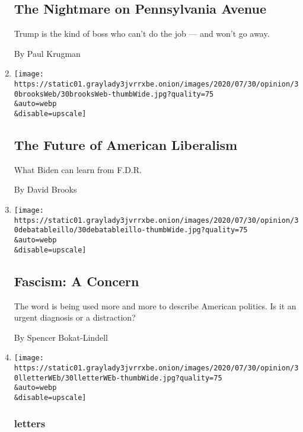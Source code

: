 \begin{enumerate}
  \hypertarget{the-nightmare-on-pennsylvania-avenue}{%
  \subsection{The Nightmare on Pennsylvania
  Avenue}\label{the-nightmare-on-pennsylvania-avenue}}

  Trump is the kind of boss who can't do the job --- and won't go away.

  By Paul Krugman
\item
  \href{/2020/07/30/opinion/biden-fdr.html}{}

  \texttt{[image: https://static01.graylady3jvrrxbe.onion/images/2020/07/30/opinion/30brooksWeb/30brooksWeb-thumbWide.jpg?quality=75\\\&auto=webp\\\&disable=upscale]}

  \hypertarget{the-future-of-american-liberalism}{%
  \subsection{The Future of American
  Liberalism}\label{the-future-of-american-liberalism}}

  What Biden can learn from F.D.R.

  By David Brooks
\item
  \href{/2020/07/30/opinion/fascism-us.html}{}

  \texttt{[image: https://static01.graylady3jvrrxbe.onion/images/2020/07/30/opinion/30debatableillo/30debatableillo-thumbWide.jpg?quality=75\\\&auto=webp\\\&disable=upscale]}

  \hypertarget{fascism-a-concern}{%
  \subsection{Fascism: A Concern}\label{fascism-a-concern}}

  The word is being used more and more to describe American politics. Is
  it an urgent diagnosis or a distraction?

  By Spencer Bokat-Lindell
\item
  \href{/2020/07/30/opinion/letters/john-lewis-civil-rights.html}{}

  \texttt{[image: https://static01.graylady3jvrrxbe.onion/images/2020/07/30/opinion/30lletterWEb/30lletterWEb-thumbWide.jpg?quality=75\\\&auto=webp\\\&disable=upscale]}

  \hypertarget{letters-2}{%
  \subsubsection{letters}\label{letters-2}}


\end{enumerate}
